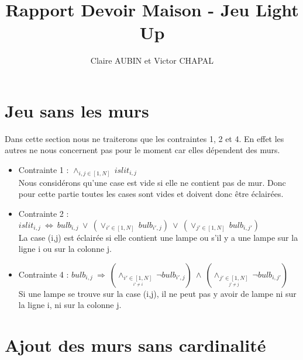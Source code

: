 \documentclass{article}
\begin{document}
\title{Rapport Devoir Maison - Jeu Light Up}
\author{Claire AUBIN et Victor CHAPAL}
\maketitle

\section{Jeu sans les murs}
Dans cette section nous ne traiterons que les contraintes 1, 2 et 4. En effet les autres ne nous concernent pas pour le moment car elles dépendent des murs.

\begin{itemize}
\item Contrainte 1 : $ \wedge_{i,j \in [1,N]} ~ islit_{i,j}  $ \\
 Nous considérons qu'une case est vide si elle ne contient pas de mur. Donc pour cette partie toutes les cases sont vides et doivent donc être éclairées.
  
\item Contrainte 2 : $ islit_{i,j} ~ \Leftrightarrow ~ bulb_{i,j} ~ \vee ~ (\vee_{i' \in [1,N]} ~ bulb_{i',j}) ~ \vee ~ (\vee_{j' \in [1,N]} ~ bulb_{i,j'}) $\\
  La case (i,j) est éclairée si elle contient une lampe ou s'il y a une lampe sur la ligne i ou sur la colonne j.
  
\item Contrainte 4 : $ bulb_{i,j} ~ \Rightarrow ~ (\wedge_{\underset{i'\neq i}{i' \in [1,N]}} ~ \neg bulb_{i',j}) ~ \wedge ~ (\wedge_{\underset{j'\neq j}{j' \in [1,N]}} ~ \neg bulb_{i,j'})  $ \\
  Si une lampe se trouve sur la case (i,j), il ne peut pas y avoir de lampe ni sur la ligne i, ni sur la colonne j.
\end{itemize}




\section{Ajout des murs sans cardinalit\'e}
\end{document}
